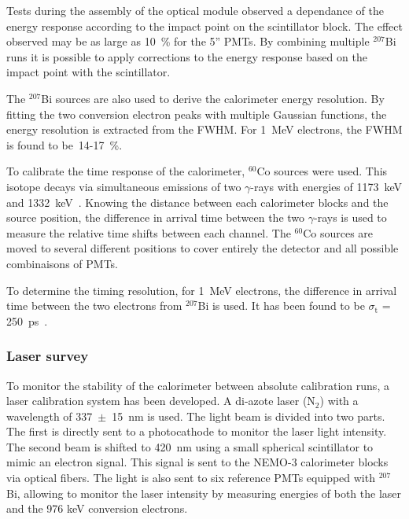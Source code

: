\documentclass[main.tex]{subfiles}
\begin{document}
\bigskip


\NI Tests during the assembly of the optical module observed a dependance of the energy response according to the impact point on the scintillator block. The effect observed may be as large as 10~\% for the 5'' PMTs. By combining multiple $^{\text{207}}$Bi runs it is possible to apply corrections to the energy response based on the impact point with the scintillator.


\bigskip


\NI The $^{\text{207}}$Bi sources are also used to derive the calorimeter energy resolution. By fitting the two conversion electron peaks with multiple Gaussian functions, the energy resolution is extracted from the FWHM. For 1~MeV electrons, the FWHM is found to be~14-17~\%. 
 
 
\bigskip


\NI To calibrate the time response of the calorimeter, $^{\text{60}}$Co sources were used. This isotope decays via simultaneous emissions of two $\gamma$-rays with energies of 1173~keV and 1332~keV~\cite{DecayCo60}. Knowing the distance between each calorimeter blocks and the source position, the difference in arrival time between the two $\gamma$-rays is used to measure the relative time shifts between each channel. The $^{\text{60}}$Co sources are moved to several different positions to cover entirely the detector and all possible combinaisons of PMTs.


\bigskip


\NI To determine the timing resolution, for 1~MeV electrons, the difference in arrival time between the two electrons from $^{\text{207}}$Bi is used. It has been found to be $\sigma_{\text{t}}$ = 250~ps~\cite{NEMO-3-detector}.

 
\subsubsection{Laser survey}


\NI To monitor the stability of the calorimeter between absolute calibration runs, a laser calibration system has been developed. A di-azote laser (N$_\text{2}$) with a wavelength of 337~$\pm$~15~nm is used. The light beam is divided into two parts. The first is directly sent to a photocathode to monitor the laser light intensity. The second beam is shifted to 420~nm using a small spherical scintillator to mimic an electron signal. This signal is sent to the NEMO-3 calorimeter blocks via optical fibers. The light is also sent to six reference PMTs equipped with $^{\text{207}}$Bi, allowing to monitor the laser intensity by measuring energies of both the laser and the 976 keV conversion electrons.
\end{document}
